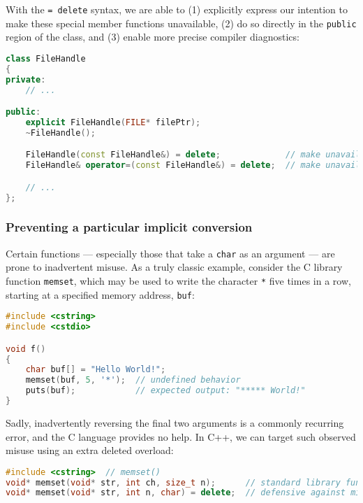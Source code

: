 \noindent With the \texttt{=}~\texttt{delete} syntax, we are able to (1)
explicitly express our intention to make these special member
functions unavailable, (2) do so directly in the \texttt{public} region
of the class, and (3) enable more precise compiler diagnostics:

\begin{lstlisting}[language=C++]
class FileHandle
{
private:
    // ...

public:
    explicit FileHandle(FILE* filePtr);
    ~FileHandle();

    FileHandle(const FileHandle&) = delete;             // make unavailable
    FileHandle& operator=(const FileHandle&) = delete;  // make unavailable

    // ...
};
\end{lstlisting}
    

\subsubsection[Preventing a particular implicit conversion]{Preventing a particular implicit conversion}\label{preventing-a-particular-implicit-conversion}

Certain functions --- especially those that take a \texttt{char} as an
argument --- are prone to inadvertent misuse. As a truly classic
example, consider the C library function \texttt{memset}, which may be used
to write the character \texttt{*} five times in a row, starting at a
specified memory address, \texttt{buf}:

\begin{lstlisting}[language=C++]
#include <cstring>
#include <cstdio>

void f()
{
    char buf[] = "Hello World!";
    memset(buf, 5, '*');  // undefined behavior
    puts(buf);            // expected output: "***** World!"
}
\end{lstlisting}
    
\noindent Sadly, inadvertently reversing the final two arguments is a commonly
recurring error, and the C language provides no help. In C++, we
can target such observed misuse using an extra deleted overload:

\begin{lstlisting}[language=C++]
#include <cstring>  // memset()
void* memset(void* str, int ch, size_t n);      // standard library function
void* memset(void* str, int n, char) = delete;  // defensive against misuse
\end{lstlisting}
    
